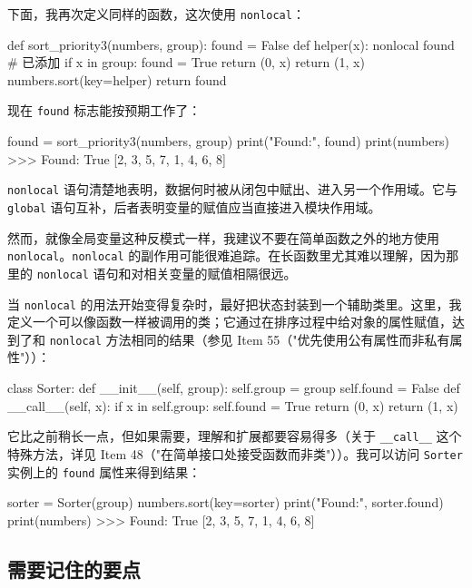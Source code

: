 下面，我再次定义同样的函数，这次使用 \texttt{nonlocal}：

\begin{codebox}[python]
def sort_priority3(numbers, group):
    found = False
    def helper(x):
        nonlocal found  # 已添加
        if x in group:
            found = True
            return (0, x)
        return (1, x)
    numbers.sort(key=helper)
    return found
\end{codebox}

现在 \texttt{found} 标志能按预期工作了：

\begin{codebox}[python]
found = sort_priority3(numbers, group)
print("Found:", found)
print(numbers)
>>>
Found: True
[2, 3, 5, 7, 1, 4, 6, 8]
\end{codebox}

\texttt{nonlocal} 语句清楚地表明，数据何时被从闭包中赋出、进入另一个作用域。它与 \texttt{global} 语句互补，后者表明变量的赋值应当直接进入模块作用域。

然而，就像全局变量这种反模式一样，我建议不要在简单函数之外的地方使用 \texttt{nonlocal}。\texttt{nonlocal} 的副作用可能很难追踪。在长函数里尤其难以理解，因为那里的 \texttt{nonlocal} 语句和对相关变量的赋值相隔很远。

当 \texttt{nonlocal} 的用法开始变得复杂时，最好把状态封装到一个辅助类里。这里，我定义一个可以像函数一样被调用的类；它通过在排序过程中给对象的属性赋值，达到了和 \texttt{nonlocal} 方法相同的结果（参见 Item 55（"优先使用公有属性而非私有属性"））：

\begin{codebox}[python]
class Sorter:
    def __init__(self, group):
        self.group = group
        self.found = False
    def __call__(self, x):
        if x in self.group:
            self.found = True
            return (0, x)
        return (1, x)
\end{codebox}

它比之前稍长一点，但如果需要，理解和扩展都要容易得多（关于 \texttt{\_\_call\_\_} 这个特殊方法，详见 Item 48（"在简单接口处接受函数而非类"））。我可以访问 \texttt{Sorter} 实例上的 \texttt{found} 属性来得到结果：

\begin{codebox}[python]
sorter = Sorter(group)
numbers.sort(key=sorter)
print("Found:", sorter.found)
print(numbers)
>>>
Found: True
[2, 3, 5, 7, 1, 4, 6, 8]
\end{codebox}

\subsection{需要记住的要点}


